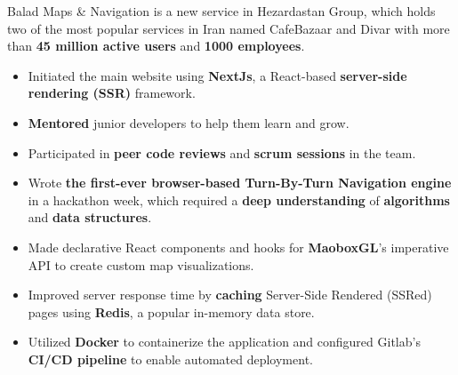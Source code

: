 \bigskip
\divider
\bigskip

Balad Maps \& Navigation is a new service in Hezardastan Group, which holds two of the most popular services in Iran named CafeBazaar and Divar with more than \textbf{45 million active users} and \textbf{1000 employees}.
\medskip
\begin{itemize}
    \item Initiated the main website using \textbf{NextJs}, a React-based \textbf{server-side rendering (SSR)} framework.
    \item \textbf{Mentored} junior developers to help them learn and grow.
    \item Participated in \textbf{peer code reviews} and \textbf{scrum sessions} in the team.
    \item Wrote \textbf{the first-ever browser-based Turn-By-Turn Navigation engine} in a hackathon week, which required a \textbf{deep understanding} of \textbf{algorithms} and \textbf{data structures}.
    \item Made declarative React components and hooks for \textbf{MaoboxGL}'s imperative API to create custom map visualizations.
    \item Improved server response time by \textbf{caching} Server-Side Rendered (SSRed) pages using \textbf{Redis}, a popular in-memory data store.
    \item Utilized \textbf{Docker} to containerize the application and configured Gitlab's \textbf{CI/CD pipeline} to enable automated deployment.
\end{itemize}

\newpage
{}
\bigskip


